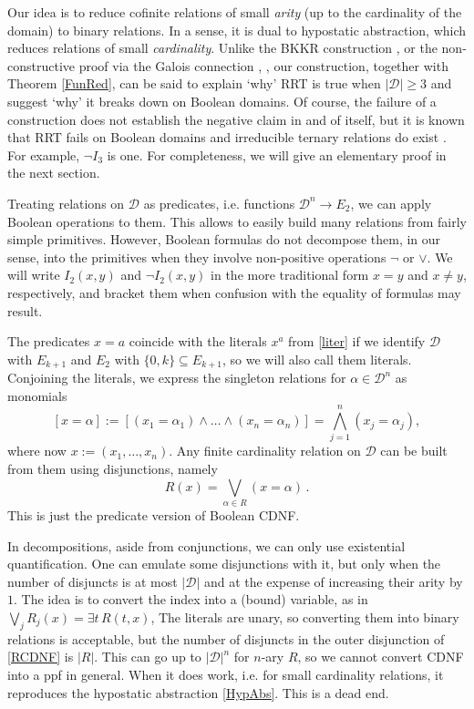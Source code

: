 \documentclass[11pt]{article}
\theoremstyle{plain}
\theoremstyle{definition}
\def\D{\mathcal{D}}
\def\a{\alpha}
\begin{document}
Our idea is to reduce cofinite relations of small {\it arity} (up to the cardinality of the domain) to binary relations. In a sense, it is dual to hypostatic abstraction, which reduces relations of small {\it cardinality}. Unlike the BKKR construction \cite{BKKR}, or the non-constructive proof via the Galois connection \cite{HerPos04}, \cite[1.1.22]{PosKal}, our construction, together with Theorem \ref{FunRed}, can be said to explain `why' RRT is true when $|\D|\geq3$ and suggest `why' it breaks down on Boolean domains. Of course, the failure of a construction does not establish the negative claim in and of itself, but it is known that RRT fails on Boolean domains and irreducible ternary relations do exist \cite{HerPos04}. For example, $\neg I_3$ is one. For completeness, we will give an elementary proof in the next section.

Treating relations on $\D$ as predicates, i.e. functions $\D^n\to E_2$, we can apply Boolean operations to them. This allows to easily build many relations from fairly simple primitives. However, Boolean formulas do not decompose them, in our sense, into the primitives when they involve non-positive operations $\neg$ or $\lor$. We will write $I_2(x,y)$ and $\neg I_2(x,y)$ in the more traditional form $x=y$ and $x\neq y$, respectively, and bracket them when confusion with the equality of formulas may result. 

The predicates $x=a$ coincide with the literals $x^a$ from \eqref{liter} if we identify $\D$ with $E_{k+1}$ and $E_2$ with $\{0,k\}\subseteq E_{k+1}$, so we will also call them literals. Conjoining the literals, we express the singleton relations for $\a\in\D^n$ as monomials 
\begin{equation}\label{Rmon}
[x=\a]:=[(x_1=\a_1)\land\dots\land(x_n=\a_n)]=\bigwedge_{j=1}^n(x_j=\a_j),
\end{equation}
where now $x:=(x_1,\dots,x_n)$. Any finite cardinality relation on $\D$ can be built from them using disjunctions, namely
\begin{equation}\label{RCDNF}
R(x)=\bigvee_{\a\in R}(x=\a)\,.
\end{equation}
This is just the predicate version of Boolean CDNF.

In decompositions, aside from conjunctions, we can only use existential quantification. One can emulate some disjunctions with it, but only when the number of disjuncts is at most $|\D|$ and at the expense of increasing their arity by $1$. The idea is to convert the index into a (bound) variable, as in $\bigvee_jR_j(x)=\exists t\,R(t,x)$, The literals are unary, so converting them into binary relations is acceptable, but the number of disjuncts in the outer disjunction of \eqref{RCDNF} is $|R|$. This can go up to $|\D|^n$ for $n$-ary $R$, so we cannot convert CDNF into a ppf in general. When it does work, i.e. for small cardinality relations, it reproduces the hypostatic abstraction \eqref{HypAbs}. This is a dead end.
\end{document}
